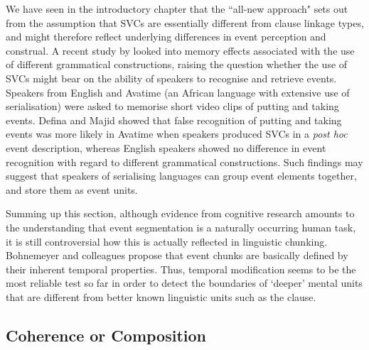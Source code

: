 We have seen in the introductory chapter that the ``all-new approach" sets out from the assumption that SVCs are essentially different from clause linkage types, and might therefore reflect underlying differences in event perception and construal. A recent study by \citet{defina2012conceptual} looked into memory effects associated with the use of different grammatical constructions, raising the question whether the use of SVCs might bear on the ability of speakers to recognise and retrieve events. Speakers from English and Avatime (an African language with extensive use of serialisation) were asked to memorise short video clips of putting and taking events. Defina and Majid showed that false recognition of putting and taking events was more likely in Avatime when speakers produced SVCs in a \textit{post hoc} event description, whereas English speakers showed no difference in event recognition with regard to different grammatical constructions. Such findings may suggest that speakers of serialising languages can group event elements together, and store them as event units.

Summing up this section, although evidence from cognitive research amounts to the understanding that event segmentation is a naturally occurring human task, it is still controversial how this is actually reflected in linguistic chunking. Bohnemeyer and colleagues propose that event chunks are basically defined by their inherent temporal properties. Thus, temporal modification seems to be the most reliable test so far in order to detect the boundaries of `deeper' mental units that are different from better known linguistic units such as the clause.

\subsection{Coherence or Composition} \label{sec:coherence}

